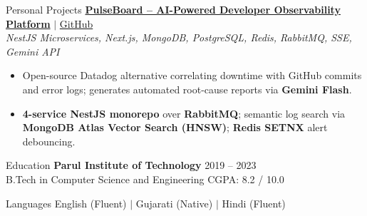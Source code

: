 \documentclass[10pt]{resume}
\begin{document}
\begin{rSection}{Personal Projects}
\textbf{\small\href{https://pulse-board-bhargavp.vercel.app/}{PulseBoard -- AI-Powered Developer Observability Platform}}
{\small $|$ \href{https://github.com/Bhargav-Ponkiya/PulseBoard}{GitHub}}\\
{\small\textit{NestJS Microservices, Next.js, MongoDB, PostgreSQL, Redis, RabbitMQ, SSE, Gemini API}}
\begin{itemize}[leftmargin=1.4em, itemsep=-0.38em, topsep=0.04em]
  \item Open-source Datadog alternative correlating downtime with GitHub commits and error logs; generates automated root-cause reports via \textbf{Gemini Flash}.
  \item \textbf{4-service NestJS monorepo} over \textbf{RabbitMQ}; semantic log search via \textbf{MongoDB Atlas Vector Search (HNSW)}; \textbf{Redis SETNX} alert debouncing.
\end{itemize}

\end{rSection}
\vspace{-0.5em}

\begin{rSection}{Education}
\textbf{Parul Institute of Technology} \hfill 2019 -- 2023 \\
B.Tech in Computer Science and Engineering \hfill CGPA: 8.2 / 10.0
\end{rSection}
\vspace{-0.5em}

\begin{rSection}{Languages}
English (Fluent) \quad $|$ \quad Gujarati (Native) \quad $|$ \quad Hindi (Fluent)
\end{rSection}
\end{document}
